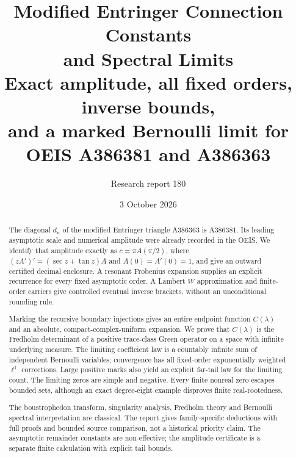 \documentclass[11pt,letterpaper]{article}
\title{\textbf{Modified Entringer Connection Constants\\and Spectral Limits}\\[7pt]\large Exact amplitude, all fixed orders, inverse bounds,\\and a marked Bernoulli limit for OEIS A386381 and A386363}
\author{Research report 180}
\date{3 October 2026}
\theoremstyle{remark}\newtheorem{remark}[theorem]{Remark}
\begin{document}
\maketitle
\begin{abstract}
The diagonal $d_n$ of the modified Entringer triangle A386363 is A386381. Its leading asymptotic scale and numerical amplitude were already recorded in the OEIS. We identify that amplitude exactly as $c=\pi A(\pi/2)$, where $(zA')'=(\sec z+\tan z)A$ and $A(0)=A'(0)=1$, and give an outward certified decimal enclosure. A resonant Frobenius expansion supplies an explicit recurrence for every fixed asymptotic order. A Lambert $W$ approximation and finite-order carriers give controlled eventual inverse brackets, without an unconditional rounding rule.

Marking the recursive boundary injections gives an entire endpoint function $C(\lambda)$ and an absolute, compact-complex-uniform expansion. We prove that $C(\lambda)$ is the Fredholm determinant of a positive trace-class Green operator on a space with infinite underlying measure. The limiting coefficient law is a countably infinite sum of independent Bernoulli variables; convergence has all fixed-order exponentially weighted $\ell^1$ corrections. Large positive marks also yield an explicit far-tail law for the limiting count. The limiting zeros are simple and negative. Every finite nonreal zero escapes bounded sets, although an exact degree-eight example disproves finite real-rootedness.

The boustrophedon transform, singularity analysis, Fredholm theory and Bernoulli spectral interpretation are classical. The report gives family-specific deductions with full proofs and bounded source comparison, not a historical priority claim. The asymptotic remainder constants are non-effective; the amplitude certificate is a separate finite calculation with explicit tail bounds.
\end{abstract}
\end{document}
